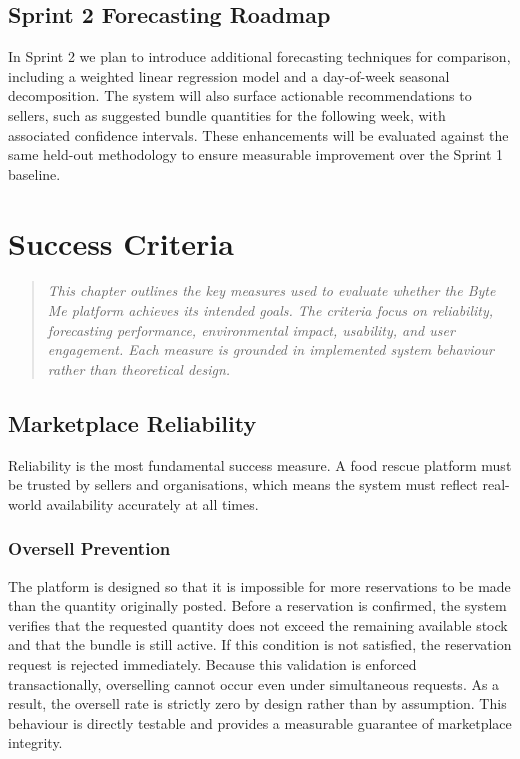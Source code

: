 \documentclass[11pt, a4paper]{report}
\newenvironment{motivation}{\begin{quotation}\noindent\small\itshape}{\end{quotation}}
\begin{document}
\section{Sprint 2 Forecasting Roadmap}
In Sprint 2 we plan to introduce additional forecasting techniques for comparison, including a weighted linear regression model and a day-of-week seasonal decomposition. The system will also surface actionable recommendations to sellers, such as suggested bundle quantities for the following week, with associated confidence intervals. These enhancements will be evaluated against the same held-out methodology to ensure measurable improvement over the Sprint 1 baseline.

\chapter{Success Criteria}

\begin{motivation}
This chapter outlines the key measures used to evaluate whether the Byte Me platform achieves its intended goals. The criteria focus on reliability, forecasting performance, environmental impact, usability, and user engagement. Each measure is grounded in implemented system behaviour rather than theoretical design.
\end{motivation}

\section{Marketplace Reliability}
Reliability is the most fundamental success measure. A food rescue platform must be trusted by sellers and organisations, which means the system must reflect real-world availability accurately at all times.

\subsection{Oversell Prevention}
The platform is designed so that it is impossible for more reservations to be made than the quantity originally posted. Before a reservation is confirmed, the system verifies that the requested quantity does not exceed the remaining available stock and that the bundle is still active.
If this condition is not satisfied, the reservation request is rejected immediately. Because this validation is enforced transactionally, overselling cannot occur even under simultaneous requests. As a result, the oversell rate is strictly zero by design rather than by assumption.
This behaviour is directly testable and provides a measurable guarantee of marketplace integrity.
\end{document}
